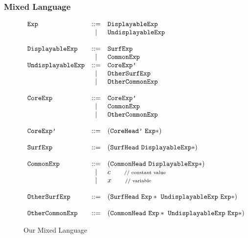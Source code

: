 \subsubsection{Mixed Language}
\begin{figure}[thb]
\begin{centering}
{\footnotesize 
\[
			\begin{array}{lcl}
			\mbox{\tt Exp} &::=& \mbox{\tt DisplayableExp}\\
			&|& \mbox{\tt UndisplayableExp}\\
\\
			\mbox{\tt DisplayableExp} &::=& \mbox{\tt SurfExp}\\
			&|& \mbox{\tt CommonExp}
\\
			\mbox{\tt UndisplayableExp} &::=& \mbox{\tt CoreExp'}\\
			&|& \mbox{\tt OtherSurfExp}\\
			&|& \mbox{\tt OtherCommonExp}\\
\\
			\mbox{\tt CoreExp} &::=& \mbox{\tt CoreExp'}\\
						 &|& \mbox{\tt CommonExp}\\
						 &|& \mbox{\tt OtherCommonExp}\\
\\
			\mbox{\tt CoreExp'} &::=& (\mbox{\tt CoreHead'}~\mbox{\tt Exp}*)\\
\\
			\mbox{\tt SurfExp} &::=& (\mbox{\tt SurfHead}~\mbox{\tt DisplayableExp}*)\\
\\
			\mbox{\tt CommonExp} &::=& (\mbox{\tt CommonHead}~\mbox{\tt DisplayableExp}*)\\
			&|& c \qquad \mbox{{\scriptsize // constant value}}\\
			&|& x \qquad \mbox{{\scriptsize // variable}} \\
\\
			\mbox{\tt OtherSurfExp} &::=& (\mbox{\tt SurfHead}~\mbox{\tt Exp}*~\mbox{\tt UndisplayableExp}~\mbox{\tt Exp}*)\\
\\
			\mbox{\tt OtherCommonExp} &::=& (\mbox{\tt CommonHead}~\mbox{\tt Exp}*~\mbox{\tt UndisplayableExp}~\mbox{\tt Exp}*)
			\end{array}
			\]
}
	
\end{centering}
\caption{Our Mixed Language}
\label{fig:mix}
\end{figure}


